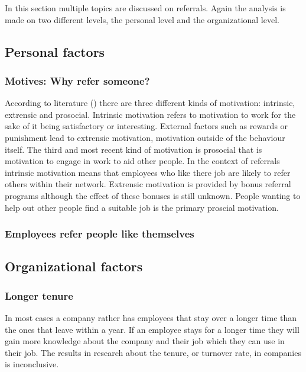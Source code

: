 \documentclass[Main.tex]{subfiles}
\begin{document}
In this section multiple topics are discussed on referrals. Again the analysis is made on two different levels, the personal level and the organizational level. 

\subsection*{Personal factors}

\subsubsection*{Motives: Why refer someone?}

According to literature (\cite{motives}) there are three different kinds of motivation: intrinsic, extrensic and prosocial. Intrinsic motivation refers to motivation to work for the sake of it being satisfactory or interesting. External factors such as rewards or punishment lead to extrensic motivation, motivation outside of the behaviour itself. The third and most recent kind of motivation is prosocial that is motivation to engage in work to aid other people. In the context of referrals intrinsic motivation means that employees who like there job are likely to refer others within their network. Extrensic motivation is provided by bonus referral programs although the effect of these bonuses is still unknown. People wanting to help out other people find a suitable job is the primary proscial motivation.

\subsubsection*{Employees refer people like themselves}


\subsection*{Organizational factors}

\subsubsection*{Longer tenure}
In most cases a company rather has employees that stay over a longer time than the ones that leave within a year. If an employee stays for a longer time they will gain more knowledge about the company and their job which they can use in their job. 
The results in research about the tenure, or turnover rate, in companies is inconclusive.
\end{document}
